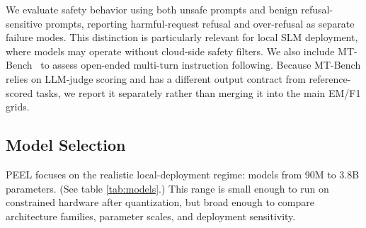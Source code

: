 \documentclass[letterpaper]{article} %
\begin{document}
We evaluate safety behavior using both unsafe prompts and benign refusal-sensitive prompts, reporting harmful-request refusal and over-refusal as separate failure modes. This distinction is particularly relevant for local
SLM deployment, where models may operate without cloud-side safety filters. We also include MT-Bench~\citep{MTBenchArena_2023} to assess open-ended multi-turn instruction following. Because MT-Bench relies on LLM-judge scoring and has a
different output contract from reference-scored tasks, we report it separately
rather than merging it into the main EM/F1 grids.

\subsection{Model Selection}
\label{sec:models}

PEEL focuses on the realistic local-deployment regime: models from 90M to 3.8B
parameters. (See table \ref{tab:models}.) This range is small enough to run on constrained hardware after
quantization, but broad enough to compare architecture families, parameter scales, and deployment sensitivity.
\end{document}
